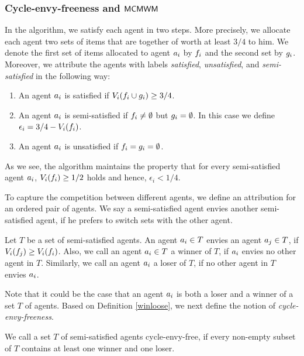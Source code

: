 \subsubsection{Cycle-envy-freeness and $\textsf{MCMWM}$}\label{additive:cef}

In the algorithm, we satisfy each agent in two steps. More precisely, we allocate each agent two sets of items that are together of worth at least $3/4$ to him. We denote the first set of items allocated to agent $a_i$ by $f_i$ and the second set by $g_i$. Moreover, we attribute the agents with labels \textit{satisfied}, \textit{unsatisfied}, and \textit{semi-satisfied} in the following way:
\begin{enumerate}
	\item An agent $a_i$ is satisfied if $V_i(f_i \cup g_i) \geq 3/4$.
	\item An agent $a_i$ is semi-satisfied if $f_i \neq \emptyset$ but $g_i = \emptyset$. In this case we define $\epsilon_i = 3/4-V_i(f_i)$.
	\item An agent $a_i$ is unsatisfied if $f_i = g_i = \emptyset$.
\end{enumerate}
As we see, the algorithm maintains the property that for every semi-satisfied agent $a_i$, $V_i(f_i) \geq 1/2$ holds and hence, $\epsilon_i < 1/4$. 

To capture the competition between different agents, we define an attribution for an ordered pair of agents. We say a semi-satisfied agent envies another semi-satisfied agent, if he prefers to switch sets with the other agent. 

\begin{definition}
\label{winloose}
Let $T$ be a set of semi-satisfied agents. An agent $a_i \in T$ envies an agent $a_j \in T$, if $V_i(f_j) \geq V_i(f_i)$. Also, we call an agent $ a_i \in T$ a winner of $T$, if $a_i$ envies no other agent in $T$. Similarly, we call an agent $a_i$ a loser of $T$, if no other agent in $T$ envies $a_i$.
\end{definition}

Note that it could be the case that an agent $a_i$ is both a loser and a winner of a set $T$ of agents. Based on Definition \ref{winloose}, we next define the notion of \textit{cycle-envy-freeness}.

\begin{definition}
 We call a set $T$ of semi-satisfied agents cycle-envy-free, if every non-empty subset of $T$ contains at least one winner and one loser. 
\end{definition}

